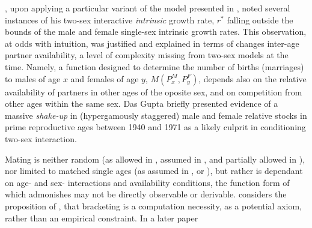 
\citet{gupta1973}, upon applying a particular variant of the model presented in
\citep{gupta1972two}, noted several instances of his two-sex 
interactive \textit{intrinsic} growth
rate, $r^\ast$ falling outside the bounds of the male and female
single-sex intrinsic growth rates. This observation, at odds with intuition, was 
justified and explained in terms of changes inter-age partner availability, a
level of complexity missing from two-sex models at the time. Namely, a function designed
to determine the number of births (marriages) to males of age $x$ and females of
age $y$, $M(P_x^M, P_y^F)$, depends also on the relative availability of
partners in other ages of the oposite sex, and on competition from other ages
within the same sex. Das Gupta briefly presented evidence of a massive
\textit{shake-up} in (hypergamously staggered) male and female relative stocks in prime
reproductive ages between 1940 and 1971 as a likely culprit in conditioning
two-sex interaction. 

Mating is neither random (as allowed in
\cite{gupta1972two}, assumed in \cite{gupta1973}, and partially allowed 
in \cite{mitra1976effect}), nor limited to matched single ages (as assumed 
in \cite{karmel1947relations}, \cite{akers1967measuring} or \cite{cabre1997tortulos}), 
but rather is dependant on age- and sex- interactions and availability 
conditions, the function form of which
\citet{coale1972growth} admonishes may not be directly observable or derivable.
\citet{gupta1973} considers the proposition of \citet{coale1972growth}, that 
bracketing is a computation necessity, as a potential axiom, rather than an 
empirical constraint. In a later paper
\citep{gupta1976interactive}


